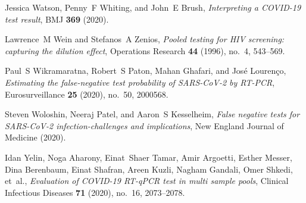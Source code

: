 \documentclass{article}
\begin{document}
\begin{thebibliography}{10}
Jessica Watson, Penny~F Whiting, and John~E Brush, \emph{Interpreting a
  {COVID}-19 test result}, {BMJ} \textbf{369} (2020).

Lawrence~M Wein and Stefanos~A Zenios, \emph{Pooled testing for {HIV}
  screening: capturing the dilution effect}, Operations Research \textbf{44}
  (1996), no.~4, 543--569.

Paul~S Wikramaratna, Robert~S Paton, Mahan Ghafari, and Jos{\'e}
  Louren{\c{c}}o, \emph{Estimating the false-negative test probability of
  {SARS-CoV}-2 by {RT-PCR}}, Eurosurveillance \textbf{25} (2020), no.~50,
  2000568.

Steven Woloshin, Neeraj Patel, and Aaron~S Kesselheim, \emph{False negative
  tests for {SARS}-{C}o{V}-2 infection-challenges and implications}, New
  England Journal of Medicine (2020).

Idan Yelin, Noga Aharony, Einat~Shaer Tamar, Amir Argoetti, Esther Messer, Dina
  Berenbaum, Einat Shafran, Areen Kuzli, Nagham Gandali, Omer Shkedi, et~al.,
  \emph{Evaluation of {COVID-19 RT-qPCR} test in multi sample pools}, Clinical
  Infectious Diseases \textbf{71} (2020), no.~16, 2073--2078.

\end{thebibliography}

% 
\end{document}
